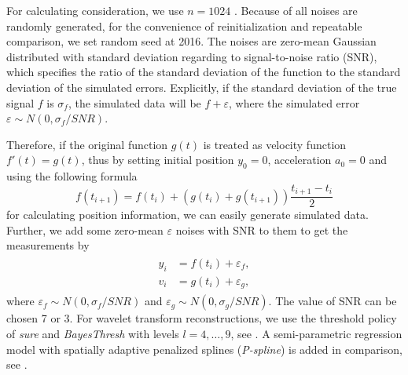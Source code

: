 For calculating consideration, we use $n=1024$ \citep{nason2010wavelet}. Because of all noises are randomly generated, for the convenience of reinitialization and repeatable comparison, we set random seed at 2016. The noises are \iid zero-mean Gaussian distributed with standard deviation regarding to signal-to-noise ratio (SNR), which specifies the ratio of the standard deviation of the function to the standard deviation of the simulated errors. Explicitly, if the standard deviation of the true signal $f$ is $\sigma_f$, the simulated data will be $f+\varepsilon$, where the simulated error  $\varepsilon \sim N(0,\sigma_f/SNR)$. 

Therefore, if the original function $g(t)$ is treated as velocity function $f'(t)=g(t)$, thus by setting initial position $y_0=0$, acceleration $a_0=0$ and using the following formula 
\begin{equation}\label{generateVelocity}
f(t_{i+1})=f(t_i)+\left(g(t_i)+g(t_{i+1}) \right)\frac{t_{i+1}-t_i}{2}
\end{equation}
for calculating position information, we can easily generate simulated data. Further, we add some \iid  zero-mean $\varepsilon$ noises with SNR to them to get the measurements by 
\begin{align}\label{tractorsplinegeneratefunctions}
\begin{split}
y_i &= f(t_i) + \varepsilon_f, \\
v_i &= g(t_i) + \varepsilon_g,
\end{split}
\end{align}
where $\varepsilon_f\sim N(0,\sigma_f/SNR)$ and $\varepsilon_g\sim N(0,\sigma_g/SNR)$. The value of SNR can be chosen 7 or 3. For wavelet transform reconstructions, we use the threshold policy of \textit{sure} and \textit{BayesThresh} with levels $l=4, \ldots, 9$, see  \citep{donoho1995adapting, abramovich1998wavelet}. A semi-parametric regression model with spatially adaptive penalized splines (\textit{P-spline}) is added in comparison, see \citep{krivobokova2008fast, ruppert2003semiparametric}.

